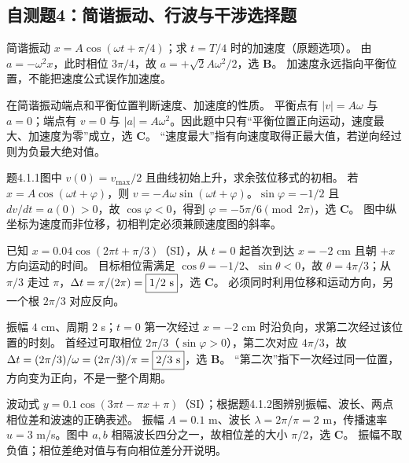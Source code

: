 
\subsection{自测题4：简谐振动、行波与干涉选择题}

\problemtext 简谐振动 $x=A\cos(\omega t+\pi/4)$；求 $t=T/4$ 时的加速度（原题选项）。
\workings 由 $a=-\omega^2x$，此时相位 $3\pi/4$，故 $\boxed{a=+\sqrt2 A\omega^2/2}$，选 \textbf{B}。
\crosscheck 加速度永远指向平衡位置，不能把速度公式误作加速度。

\problemtext 在简谐振动端点和平衡位置判断速度、加速度的性质。
\workings 平衡点有 $|v|=A\omega$ 与 $a=0$；端点有 $v=0$ 与 $|a|=A\omega^2$。因此题中只有“平衡位置正向运动，速度最大、加速度为零”成立，选 \textbf{C}。
\crosscheck “速度最大”指有向速度取得正最大值，若逆向经过则为负最大绝对值。

\problemtext 题4.1.1图中 $v(0)=v_{\max}/2$ 且曲线初始上升，求余弦位移式的初相。
\workings 若 $x=A\cos(\omega t+\varphi)$，则 $v=-A\omega\sin(\omega t+\varphi)$。$\sin\varphi=-1/2$ 且 $dv/dt=a(0)>0$，故 $\cos\varphi<0$，得到 $\boxed{\varphi=-5\pi/6\pmod{2\pi}}$，选 \textbf{C}。
\crosscheck 图中纵坐标为速度而非位移，初相判定必须兼顾速度图的斜率。

\problemtext 已知 $x=0.04\cos(2\pi t+\pi/3)$（SI），从 $t=0$ 起首次到达 $x=-2$ cm 且朝 $+x$ 方向运动的时间。
\workings 目标相位需满足 $\cos\theta=-1/2$、$\sin\theta<0$，故 $\theta=4\pi/3$；从 $\pi/3$ 走过 $\pi$，$\Delta t=\pi/(2\pi)=\boxed{1/2\ {\rm s}}$，选 \textbf{C}。
\crosscheck 必须同时利用位移和运动方向，另一个根 $2\pi/3$ 对应反向。

\problemtext 振幅 $4$ cm、周期 $2$ s；$t=0$ 第一次经过 $x=-2$ cm 时沿负向，求第二次经过该位置的时刻。
\workings 首经过可取相位 $2\pi/3$（$\sin\varphi>0$），第二次对应 $4\pi/3$，故 $\Delta t=(2\pi/3)/\omega=(2\pi/3)/\pi=\boxed{2/3\ {\rm s}}$，选 \textbf{B}。
\crosscheck “第二次”指下一次经过同一位置，方向变为正向，不是一整个周期。

\problemtext 波动式 $y=0.1\cos(3\pi t-\pi x+\pi)$（SI）；根据题4.1.2图辨别振幅、波长、两点相位差和波速的正确表述。
\workings 振幅 $A=0.1$ m、波长 $\lambda=2\pi/\pi=2$ m，传播速率 $u=3$ m/s。图中 $a,b$ 相隔波长四分之一，故相位差的大小 $\pi/2$，选 \textbf{C}。
\crosscheck 振幅不取负值；相位差绝对值与有向相位差分开说明。

